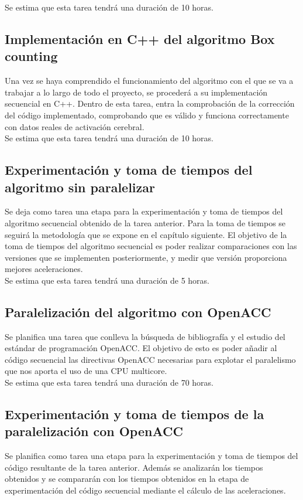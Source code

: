 Se estima que esta tarea tendrá una duración de 10 horas.

\subsection{Implementación en C++ del algoritmo Box counting}
Una vez se haya comprendido el funcionamiento del algoritmo con el que se va a trabajar a lo largo de todo el proyecto, se procederá a su implementación secuencial en C++. Dentro de esta tarea, entra la comprobación de la corrección del código implementado, comprobando que es válido y funciona correctamente con datos reales de activación cerebral.\\

Se estima que esta tarea tendrá una duración de 10 horas.

\subsection{Experimentación y toma de tiempos del algoritmo sin paralelizar}
Se deja como tarea una etapa para la experimentación y toma de tiempos del algoritmo secuencial obtenido de la tarea anterior. Para la toma de tiempos se seguirá la metodología que se expone en el capítulo siguiente. El objetivo de la toma de tiempos del algoritmo secuencial es poder realizar comparaciones con las versiones que se implementen posteriormente, y medir que versión proporciona mejores aceleraciones.\\

Se estima que esta tarea tendrá una duración de 5 horas.

\subsection{Paralelización del algoritmo con OpenACC}
Se planifica una tarea que conlleva la búsqueda de bibliografía y el estudio del estándar de programación OpenACC. El objetivo de esto es poder añadir al código secuencial las directivas OpenACC necesarias para explotar el paralelismo que nos aporta el uso de una CPU multicore.\\

Se estima que esta tarea tendrá una duración de 70 horas.

\subsection{Experimentación y toma de tiempos de la paralelización con OpenACC}
Se planifica como tarea una etapa para la experimentación y toma de tiempos del código resultante de la tarea anterior. Además se analizarán los tiempos obtenidos y se compararán con los tiempos obtenidos en la etapa de experimentación del código secuencial mediante el cálculo de las aceleraciones.\\

